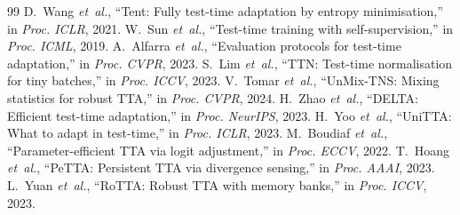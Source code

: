 \documentclass{article}
\begin{document}
\begin{thebibliography}{99}
 D.~Wang \emph{et~al.}, ``Tent: Fully test-time adaptation by entropy minimisation,'' in \emph{Proc. ICLR}, 2021.
 W.~Sun \emph{et~al.}, ``Test-time training with self-supervision,'' in \emph{Proc. ICML}, 2019.
 A.~Alfarra \emph{et~al.}, ``Evaluation protocols for test-time adaptation,'' in \emph{Proc. CVPR}, 2023.
 S.~Lim \emph{et~al.}, ``TTN: Test-time normalisation for tiny batches,'' in \emph{Proc. ICCV}, 2023.
 V.~Tomar \emph{et~al.}, ``UnMix-TNS: Mixing statistics for robust TTA,'' in \emph{Proc. CVPR}, 2024.
 H.~Zhao \emph{et~al.}, ``DELTA: Efficient test-time adaptation,'' in \emph{Proc. NeurIPS}, 2023.
 H.~Yoo \emph{et~al.}, ``UniTTA: What to adapt in test-time,'' in \emph{Proc. ICLR}, 2023.
 M.~Boudiaf \emph{et~al.}, ``Parameter-efficient TTA via logit adjustment,'' in \emph{Proc. ECCV}, 2022.
 T.~Hoang \emph{et~al.}, ``PeTTA: Persistent TTA via divergence sensing,'' in \emph{Proc. AAAI}, 2023.
 L.~Yuan \emph{et~al.}, ``RoTTA: Robust TTA with memory banks,'' in \emph{Proc. ICCV}, 2023.
\end{thebibliography}
\end{document}
